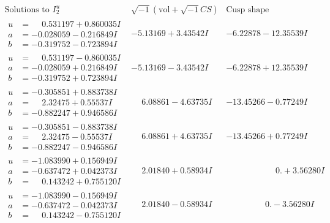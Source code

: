 \documentclass[1p]{elsarticle_modified}
\theoremstyle{definition}
\newcommand{\I}{\sqrt{-1}}
\begin{document}
$$\begin{array}{c|c|c}  
\text{Solutions to }I^u_{2}& \I (\text{vol} + \sqrt{-1}CS) & \text{Cusp shape}\\
 \hline 
\begin{aligned}
u &= \phantom{-}0.531197 + 0.860035 I \\
a &= -0.028059 - 0.216849 I \\
b &= -0.319752 - 0.723894 I\end{aligned}
 & -5.13169 + 3.43542 I & -6.22878 - 12.35539 I \\ \hline\begin{aligned}
u &= \phantom{-}0.531197 - 0.860035 I \\
a &= -0.028059 + 0.216849 I \\
b &= -0.319752 + 0.723894 I\end{aligned}
 & -5.13169 - 3.43542 I & -6.22878 + 12.35539 I \\ \hline\begin{aligned}
u &= -0.305851 + 0.883738 I \\
a &= \phantom{-}2.32475 + 0.55537 I \\
b &= -0.882247 + 0.946586 I\end{aligned}
 & \phantom{-}6.08861 - 4.63735 I & -13.45266 - 0.77249 I \\ \hline\begin{aligned}
u &= -0.305851 - 0.883738 I \\
a &= \phantom{-}2.32475 - 0.55537 I \\
b &= -0.882247 - 0.946586 I\end{aligned}
 & \phantom{-}6.08861 + 4.63735 I & -13.45266 + 0.77249 I \\ \hline\begin{aligned}
u &= -1.083990 + 0.156949 I \\
a &= -0.637472 + 0.042373 I \\
b &= \phantom{-}0.143242 + 0.755120 I\end{aligned}
 & \phantom{-}2.01840 + 0.58934 I & \phantom{-0.000000 -}0. + 3.56280 I \\ \hline\begin{aligned}
u &= -1.083990 - 0.156949 I \\
a &= -0.637472 - 0.042373 I \\
b &= \phantom{-}0.143242 - 0.755120 I\end{aligned}
 & \phantom{-}2.01840 - 0.58934 I & \phantom{-0.000000 } 0. - 3.56280 I \\ \hline\begin{aligned}

\end{aligned}
\end{array}$$
\end{document}

